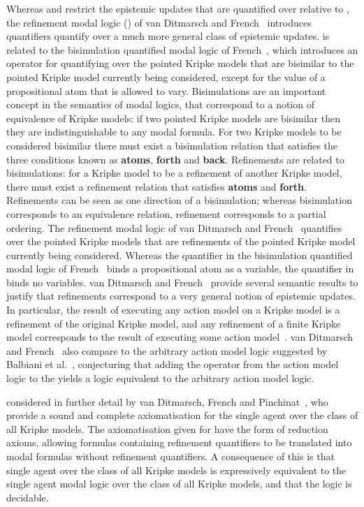 Whereas \logicGal{} and \logicCal{} restrict the epistemic updates that are quantified over relative to \logicApal{}, the refinement modal logic (\logicRml{}) of van Ditmarsch and French~\cite{vanditmarsch:2009} introduces quantifiers quantify over a much more general class of epistemic updates.
\logicRml{} is related to the bisimulation quantified modal logic of French~\cite{french:2006}, which introduces an operator for quantifying over the pointed Kripke models that are bisimilar to the pointed Kripke model currently being considered, except for the value of a propositional atom that is allowed to vary.
Bisimulations are an important concept in the semantics of modal logics, that correspond to a notion of equivalence of Kripke models: if two pointed Kripke models are bisimilar then they are indistinguishable to any modal formula.
For two Kripke models to be considered bisimilar there must exist a bisimulation relation that satisfies the three conditions known as {\bf atoms}, {\bf forth} and {\bf back}.
Refinements are related to bisimulations: for a Kripke model to be a refinement of another Kripke model, there must exist a refinement relation that satisfies {\bf atoms} and {\bf forth}.
Refinements can be seen as one direction of a bisimulation; whereas bisimulation corresponds to an equivalence relation, refinement corresponds to a partial ordering.
The refinement modal logic of van Ditmarsch and French~\cite{vanditmarsch:2009} quantifies over the pointed Kripke models that are refinements of the pointed Kripke model currently being considered.
Whereas the quantifier in the bisimulation quantified modal logic of French~\cite{french:2006} binds a propositional atom as a variable, the quantifier in \logicRml{} binds no variables.
van Ditmarsch and French~\cite{vanditmarsch:2009} provide several semantic results to justify that refinements correspond to a very general notion of epistemic updates.
In particular, the result of executing any action model on a Kripke model is a refinement of the original Kripke model, and any refinement of a finite Kripke model corresponds to the result of executing some action model~\cite{vanditmarsch:2009}.
van Ditmarsch and French~\cite{vanditmarsch:2009} also compare \logicRml{} to the arbitrary action model logic suggested by Balbiani et al.~\cite{balbiani:2007}, conjecturing that adding the operator from the action model logic to the \logicRml{} yields a logic equivalent to the arbitrary action model logic.

\logicRml{} considered in further detail by van Ditmarsch, French and Pinchinat~\cite{vanditmarsch:2010}, who provide a sound and complete axiomatisation for the single agent \logicRml{} over the class of all Kripke models.
The axiomatisation given for \logicRml{} have the form of reduction axioms, allowing formulas containing refinement quantifiers to be translated into modal formulas without refinement quantifiers.
A consequence of this is that single agent \logicRml{} over the class of all Kripke models is expressively equivalent to the single agent modal logic over the class of all Kripke models, and that the logic is decidable.

